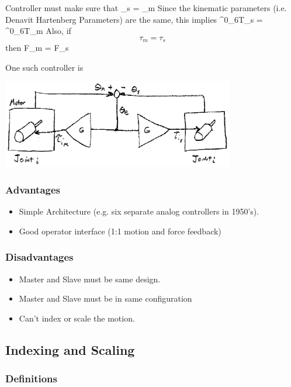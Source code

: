 Controller must make sure that
\bq
\theta_s = \theta_m
\eq
Since the kinematic parameters (i.e. Denavit Hartenberg Parameters) are the same, this implies
\bq
^0_6T_s = ^0_6T_m
\eq
Also, if
\[
\tau_m = \tau_s
\]
then
\bq
F_m = F_s
\eq

One such controller is

\includegraphics[width=4.0in]{figs14/00403.eps}



\subsubsection*{Advantages}
\begin{itemize}
   \item Simple Architecture (e.g. six separate analog controllers in 1950's).
   \item Good operator interface (1:1 motion and force feedback)
\end{itemize}

\subsubsection*{Disadvantages}
\begin{itemize}
   \item Master and Slave must be same design.
   \item Master and Slave must be in same configuration
   \item Can't index or scale the motion.
\end{itemize}


\subsection{Indexing and Scaling}
\subsubsection{Definitions}

